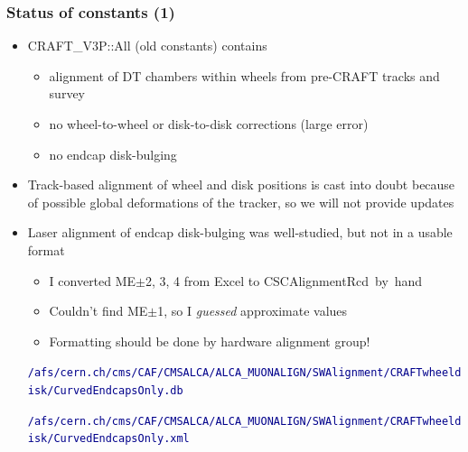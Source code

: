 \documentclass[compress]{beamer}
\begin{document}
\begin{frame}
\frametitle{Status of constants (1)}
\begin{itemize}
\item CRAFT\_V3P::All (old constants) contains
\begin{itemize}\setlength{\itemsep}{0.1 cm}
\item alignment of DT chambers within wheels from pre-CRAFT tracks and survey
\item no wheel-to-wheel or disk-to-disk corrections (large error)
\item no endcap disk-bulging
\end{itemize}

\item Track-based alignment of wheel and disk positions is cast into
  doubt because of possible global deformations of the tracker, so we
  will not provide updates

\item Laser alignment of endcap disk-bulging was well-studied, but not in a usable format
\begin{itemize}\setlength{\itemsep}{0.1 cm}
\item I converted ME$\pm$2, 3, 4 from Excel to \mbox{CSCAlignmentRcd by hand\hspace{-1 cm}}
\item Couldn't find ME$\pm$1, so I {\it guessed} approximate values
\item Formatting should be done by hardware alignment group!
\end{itemize}

\textcolor{darkblue}{\tiny \tt /afs/cern.ch/cms/CAF/CMSALCA/ALCA\_MUONALIGN/SWAlignment/CRAFTwheeldisk/CurvedEndcapsOnly.db}

\textcolor{darkblue}{\tiny \tt /afs/cern.ch/cms/CAF/CMSALCA/ALCA\_MUONALIGN/SWAlignment/CRAFTwheeldisk/CurvedEndcapsOnly.xml}

\end{itemize}
\end{frame}
\end{document}
